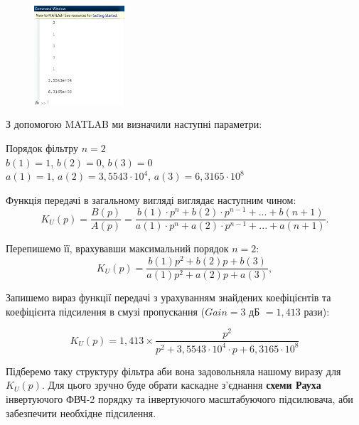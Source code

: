 \documentclass[14pt,a4paper]{scrartcl}
\begin{document}
\begin{figure}[!h]\TopFloatBoxes\CenterFloatBoxes
{}
{\includegraphics[width=0.3\textwidth]{prog_result}}
\end{figure}
\newpage
З допомогою MATLAB ми визначили наступні параметри:
\begin{center}
Порядок фільтру $n=2$\\[0.5cm]
$b(1)=1$, $b(2)=0$, $b(3)=0$\\[0.5cm]
$a(1)=1$, $a(2)=3,5543\cdot{10^4}$, $a(3)=6,3165\cdot{10^8}$
\end{center}

Функція передачі в загальному вигляді виглядає наступним чином:
\begin{equation}
K_U(p)=\dfrac{B(p)}{A(p)}=\dfrac{b(1)\cdot p^n+b(2)\cdot p^{n-1}+...+b(n+1)}{a(1)\cdot p^n+a(2)\cdot p^{n-1}+...+a(n+1)}.
\end{equation}

Перепишемо її, врахувавши максимальний порядок $n=2$:
\begin{equation}
K_U(p)=\dfrac{b(1)p^2+b(2)p+b(3)}{a(1)p^2+a(2)p+a(3)},
\end{equation}

Запишемо вираз функції передачі з урахуванням знайдених коефіцієнтів та коефіцієнта підсилення в смузі пропускання ($Gain=3$ дБ $=1,413$ рази):

\begin{equation}
K_U(p)=1,413\times\dfrac{p^2}{p^2+3,5543\cdot{10^4}\cdot p+6,3165\cdot{10^8}}
\end{equation}

Підберемо таку структуру фільтра аби вона задовольняла нашому виразу для $K_U(p)$. Для цього зручно буде обрати каскадне з'єднання {\bf схеми Рауха} інвертуючого ФВЧ-2 порядку та інвертуючого масштабуючого підсилювача, аби забезпечити необхідне підсилення.
\end{document}
